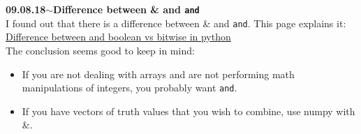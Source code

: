\documentclass[11pt,a4paper]{article}
\newenvironment{loggentry}[2]%
{\noindent\textbf{#1}\hspace{1cm}$\mathbf{\sim}$\text{ }\textbf{#2}\\}{\vspace{0.5cm}}
\begin{document}
\begin{loggentry}{09.08.18}{Difference between \& and \texttt{and}}
I found out that there is a difference between \& and \texttt{and}. This page explains it:\\
\href{https://stackoverflow.com/questions/22646463/difference-between-and-boolean-vs-bitwise-in-python-why-difference-i#22647006}{Difference between and boolean vs bitwise in python}\\
The conclusion seems good to keep in mind:\\
\begin{itemize}
\item If you are not dealing with arrays and are not performing math manipulations of integers, you probably want \texttt{and}.
\item If you have vectors of truth values that you wish to combine, use numpy with \&.
\end{itemize}
\end{loggentry}
\end{document}
